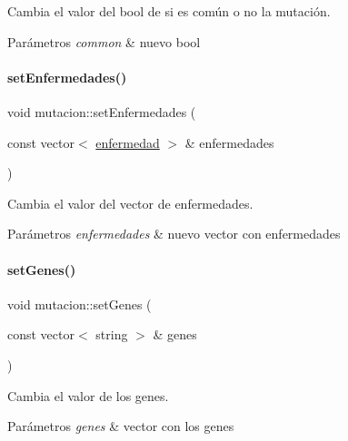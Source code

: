 Cambia el valor del bool de si es común o no la mutación. 


\begin{DoxyParams}{Parámetros}
{\em common} & nuevo bool \\
\hline
\end{DoxyParams}
\hypertarget{classmutacion_acaad50a2aab9f6df3994a491eab44a86}{}\label{classmutacion_acaad50a2aab9f6df3994a491eab44a86} 
\paragraph{\texorpdfstring{set\+Enfermedades()}{setEnfermedades()}}
{\footnotesize\ttfamily void mutacion\+::set\+Enfermedades (\begin{DoxyParamCaption}\item[{const vector$<$ \hyperlink{classenfermedad}{enfermedad} $>$ \&}]{enfermedades }\end{DoxyParamCaption})}



Cambia el valor del vector de enfermedades. 


\begin{DoxyParams}{Parámetros}
{\em enfermedades} & nuevo vector con enfermedades \\
\hline
\end{DoxyParams}
\hypertarget{classmutacion_a91fd0ad088ac82897ccad36598b43830}{}\label{classmutacion_a91fd0ad088ac82897ccad36598b43830} 
\paragraph{\texorpdfstring{set\+Genes()}{setGenes()}}
{\footnotesize\ttfamily void mutacion\+::set\+Genes (\begin{DoxyParamCaption}\item[{const vector$<$ string $>$ \&}]{genes }\end{DoxyParamCaption})}



Cambia el valor de los genes. 


\begin{DoxyParams}{Parámetros}
{\em genes} & vector con los genes \\
\hline
\end{DoxyParams}
\hypertarget{classmutacion_af6288453d3cb4e29b8be304ca262b170}{}\label{classmutacion_af6288453d3cb4e29b8be304ca262b170} 
